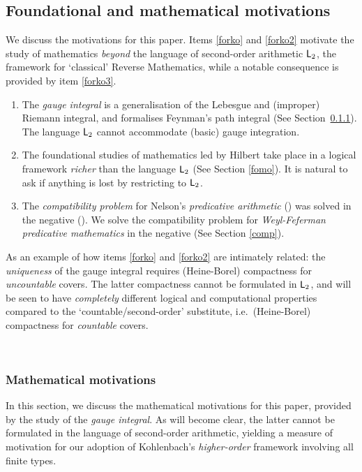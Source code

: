 \documentclass[reqno]{amsart}
\def\L{\textsf{\textup{L}}}
\numberwithin{equation}{section}
\numberwithin{thm}{section}
\begin{document}
\subsection{Foundational and mathematical motivations}\label{foma}
We discuss the motivations for this paper.  Items \eqref{forko} and \eqref{forko2} motivate the study of mathematics \emph{beyond} the language of second-order arithmetic $\L_{2}$, the framework for `classical' Reverse Mathematics, while a notable consequence is provided by item \eqref{forko3}.  
\begin{enumerate}
\renewcommand{\theenumi}{\roman{enumi}}
\item The \emph{gauge integral} is a generalisation of the Lebesgue and (improper) Riemann integral, and formalises Feynman's path integral (See Section~\ref{mamo}).  
The language $\L_{2}$ cannot accommodate (basic) gauge integration.\label{forko}
\item The foundational studies of mathematics led by Hilbert take place in a logical framework \emph{richer} than the language $\L_{2}$ (See Section \ref{fomo}).  
It is natural to ask if anything is lost by restricting to $\L_{2}$.  \label{forko2}
\item The \emph{compatibility problem} for Nelson's \emph{predicative arithmetic} (\cite{ohnelly}) was solved in the negative (\cite{buss3}).  We solve the compatibility problem for \emph{Weyl-Feferman predicative mathematics} in the negative (See Section \ref{comp}).  \label{forko3}
\end{enumerate}
As an example of how items \eqref{forko} and \eqref{forko2} are intimately related: the \emph{uniqueness} of the gauge integral requires (Heine-Borel) compactness for \emph{uncountable} covers.  
The latter compactness cannot be formulated in $\L_{2}$, and will be seen to have \emph{completely} different logical and computational properties compared to the `countable/second-order' substitute, i.e.\ (Heine-Borel) compactness for \emph{countable} covers.  

\

\subsubsection{Mathematical motivations}\label{mamo}
In this section, we discuss the mathematical motivations for this paper, provided by the study of the \emph{gauge integral}.  
As will become clear,  the latter cannot be formulated in the language of second-order arithmetic, yielding a measure of motivation 
for our adoption of Kohlenbach's \emph{higher-order} framework involving all finite types.  
\end{document}
